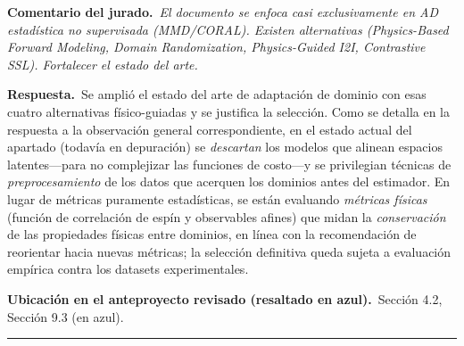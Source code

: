 \documentclass[11pt]{article}
\newcommand{\comentario}[1]{\par\smallskip\noindent\textbf{\color{jgris}Comentario del jurado.}\ \textit{#1}\par}
\newcommand{\respuesta}[1]{\par\smallskip\noindent\textbf{\color{jverde}Respuesta.}\ #1\par}
\newcommand{\ubic}[1]{\par\smallskip\noindent\textbf{\color{jazul}Ubicación en el anteproyecto revisado (resaltado en azul).}\ #1\par\medskip\hrule\medskip}
\begin{document}
\comentario{El documento se enfoca casi exclusivamente en AD estadística no supervisada (MMD/CORAL). Existen alternativas (Physics-Based Forward Modeling, Domain Randomization, Physics-Guided I2I, Contrastive SSL). Fortalecer el estado del arte.}
\respuesta{Se amplió el estado del arte de adaptación de dominio con esas cuatro alternativas físico-guiadas y se justifica la selección. Como se detalla en la respuesta a la observación general correspondiente, en el estado actual del apartado (todavía en depuración) se \emph{descartan} los modelos que alinean espacios latentes---para no complejizar las funciones de costo---y se privilegian técnicas de \emph{preprocesamiento} de los datos que acerquen los dominios antes del estimador. En lugar de métricas puramente estadísticas, se están evaluando \emph{métricas físicas} (función de correlación de espín y observables afines) que midan la \emph{conservación} de las propiedades físicas entre dominios, en línea con la recomendación de reorientar hacia nuevas métricas; la selección definitiva queda sujeta a evaluación empírica contra los datasets experimentales.}
\ubic{Sección 4.2, Sección 9.3 (en azul).}
\end{document}
